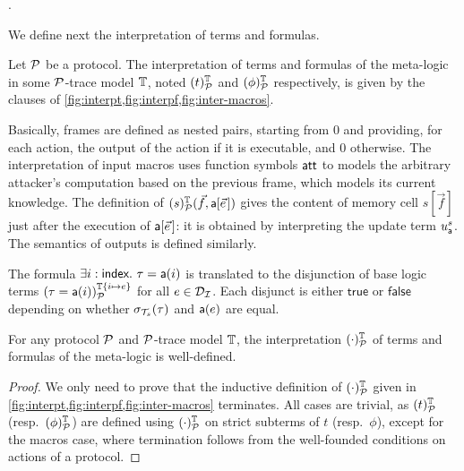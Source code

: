 \newcommand{\interp}[3]{(#1)^{#2}_{#3}}

.

We define next the interpretation of terms and formulas. %

\begin{definition}
  Let $\mathcal{P}$ be a protocol. The interpretation of terms and formulas of the meta-logic in some $\mathcal{P}$-trace model $\mathbb{T}$, noted $\interp{t}{\TM}{\calp}$ and $\interp{\phi}{\TM}{\calp}$
  respectively, is given by the clauses of \cref{fig:interpt,fig:interpf,fig:inter-macros}.
\end{definition}

Basically, frames are defined as nested pairs, starting from $0$ and
providing, for each action, the output of the action if it is executable,
and $0$ otherwise. The interpretation of input macros uses function symbols $\mathsf{att}$ to models the arbitrary attacker's computation based on the previous frame, which models its current knowledge. The definition of $\interp{s}{\TM}{\calp}(\vec{f},\sfa[\pvec{e}])$ gives the content of memory cell $s[\vec{f}]$ just after the execution of $\sfa[\pvec{e}]$:
it is obtained by interpreting the update term $u_{\textsf{a}}^{s}$. The semantics of outputs is defined similarly. 



\begin{example}
  The formula
  $\exists i:\textsf{index}.~ \tau = \textsf{a}(i)$
  is translated to the disjunction of base logic terms
  $\interp{\tau = \sfa(i)}{\TM\{i\mapsto e\}}{\calp}$ for all $e \in \mathcal{D}_{\mathcal{I}}$.
  Each disjunct is either $\mathsf{true}$ or $\mathsf{false}$ depending on
  whether $\sigma_{\mathcal{T}_s}(\tau)$ and $\textsf{a}(e)$ are equal.
\end{example}

\begin{proposition}
  For any protocol $\mathcal{P}$ and $\mathcal{P}$-trace model $\mathbb{T}$, the interpretation $\interp{\cdot}{\TM}{\calp}$ of terms and formulas of the meta-logic is well-defined.
\end{proposition}

\begin{proof}
  We only need to prove that the inductive definition of $\interp{\cdot}{\TM}{\calp}$ given in \cref{fig:interpt,fig:interpf,fig:inter-macros} terminates. All cases are trivial, as $\interp{t}{\TM}{\calp}$ (resp.\ $\interp{\phi}{\TM}{\calp}$) are defined using $\interp{\cdot}{\TM}{\calp}$ on strict subterms of $t$ (resp.\ $\phi$), except for the macros case, where termination follows from the well-founded conditions on actions of a protocol.
\end{proof}


